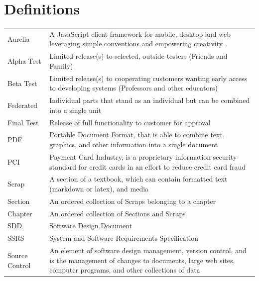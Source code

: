 \documentclass[letterpaper, 10pt, draftclsnofoot, compsoc, onecolumn]{IEEEtran}
\begin{document}
\section{Definitions}
\begin{center}


\begin{supertabular}{p{3cm}p{12cm}}

Aurelia & A JavaScript client framework for mobile, desktop and web leveraging 
	simple conventions and empowering creativity \cite{Aurelia}. \\

Alpha Test & Limited release(s) to selected, outside testers (Friends and Family)\\ 

Beta Test & Limited release(s) to cooperating customers wanting early 
	access to developing systems (Professors and other educators)\\ 
	
Federated & Individual parts that stand as an individual but can be combined into a single unit \\ 

Final Test & Release of full functionality to customer for approval \\ 

PDF & Portable Document Format, that is able to combine text, 
	graphics, and other information into a single document \\ 
	
PCI & Payment Card Industry, is a proprietary information security 
standard for credit cards in an effort to reduce credit card fraud \\ 

Scrap & A section of a textbook, which can contain formatted text (markdown or latex), and media \\ 

Section & An ordered collection of Scraps belonging to a chapter\\ 

Chapter & An ordered collection of Sections and Scraps\\ 

SDD & Software Design Document \\ 

SSRS & System and Software Requirements Specification \\ 

Source Control & An element of software design management, version control, and is the 
management of changes to documents, large web sites, computer programs, and other 
collections of data \\ 


\end{supertabular}
\end{center}
\end{document}
